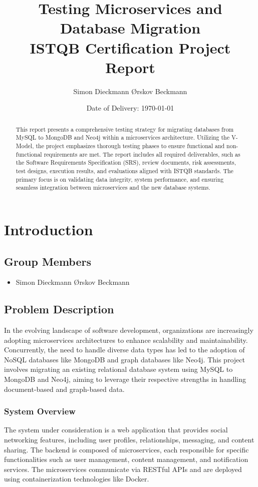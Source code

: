 \documentclass[12pt,a4paper]{report}
\title{
    \bfseries Testing Microservices and Database Migration\\
    \vspace{0.5cm}
    \large ISTQB Certification Project Report
}
\author{
    Simon Dieckmann Ørskov Beckmann \\
}
\date{Date of Delivery: \today}
\begin{document}
\maketitle
\thispagestyle{empty}
\newpage

\tableofcontents
\listoffigures
\listoftables
\newpage

\begin{abstract}
This report presents a comprehensive testing strategy for migrating databases from MySQL to MongoDB and Neo4j within a microservices architecture. Utilizing the V-Model, the project emphasizes thorough testing phases to ensure functional and non-functional requirements are met. The report includes all required deliverables, such as the Software Requirements Specification (SRS), review documents, risk assessments, test designs, execution results, and evaluations aligned with ISTQB standards. The primary focus is on validating data integrity, system performance, and ensuring seamless integration between microservices and the new database systems.
\end{abstract}
\newpage

\chapter{Introduction}
\section{Group Members}
\begin{itemize}
    \item Simon Dieckmann Ørskov Beckmann
\end{itemize}

\section{Problem Description}
In the evolving landscape of software development, organizations are increasingly adopting microservices architectures to enhance scalability and maintainability. Concurrently, the need to handle diverse data types has led to the adoption of NoSQL databases like MongoDB and graph databases like Neo4j. This project involves migrating an existing relational database system using MySQL to MongoDB and Neo4j, aiming to leverage their respective strengths in handling document-based and graph-based data.

\subsection{System Overview}
The system under consideration is a web application that provides social networking features, including user profiles, relationships, messaging, and content sharing. The backend is composed of microservices, each responsible for specific functionalities such as user management, content management, and notification services. The microservices communicate via RESTful APIs and are deployed using containerization technologies like Docker.
\end{document}
